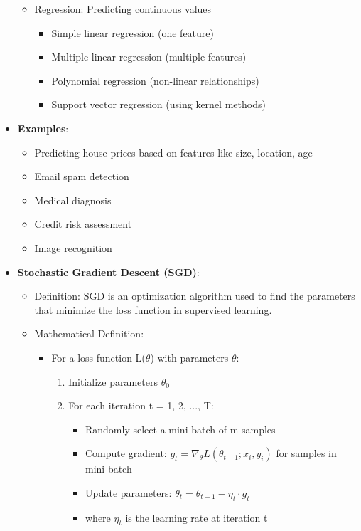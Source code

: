\documentclass{article}
\begin{document}
\begin{itemize}
\begin{itemize}
        \item Regression: Predicting continuous values
        \begin{itemize}
            \item Simple linear regression (one feature)
            \item Multiple linear regression (multiple features)
            \item Polynomial regression (non-linear relationships)
            \item Support vector regression (using kernel methods)
        \end{itemize}
    \end{itemize}
    
    \item \textbf{Examples}:
    \begin{itemize}
        \item Predicting house prices based on features like size, location, age
        \item Email spam detection
        \item Medical diagnosis
        \item Credit risk assessment
        \item Image recognition
    \end{itemize}
    
    \item \textbf{Stochastic Gradient Descent (SGD)}:
    \begin{itemize}
        \item Definition: SGD is an optimization algorithm used to find the parameters that minimize the loss function in supervised learning.
        
        \item Mathematical Definition:
        \begin{itemize}
            \item For a loss function L($\theta$) with parameters $\theta$:
            \begin{enumerate}
                \item Initialize parameters $\theta_0$
                \item For each iteration t = 1, 2, ..., T:
                \begin{itemize}
                    \item Randomly select a mini-batch of m samples
                    \item Compute gradient: $g_t = \nabla_\theta L(\theta_{t-1}; x_i, y_i)$ for samples in mini-batch
                    \item Update parameters: $\theta_t = \theta_{t-1} - \eta_t \cdot g_t$
                    \item where $\eta_t$ is the learning rate at iteration t
                \end{itemize}
            \end{enumerate}
        \end{itemize}
        

\end{itemize}
\end{itemize}
\end{document}
